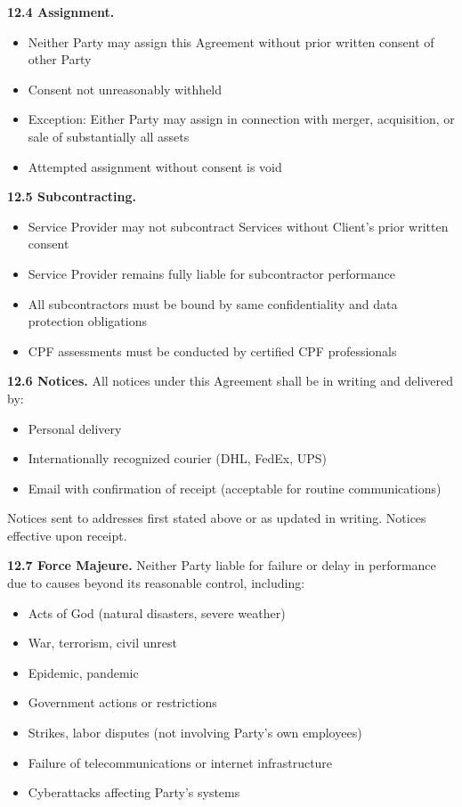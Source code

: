 \documentclass[11pt,a4paper]{article}
\begin{document}
\textbf{12.4 Assignment.}
\begin{itemize}
\item Neither Party may assign this Agreement without prior written consent of other Party
\item Consent not unreasonably withheld
\item Exception: Either Party may assign in connection with merger, acquisition, or sale of substantially all assets
\item Attempted assignment without consent is void
\end{itemize}

\textbf{12.5 Subcontracting.}
\begin{itemize}
\item Service Provider may not subcontract Services without Client's prior written consent
\item Service Provider remains fully liable for subcontractor performance
\item All subcontractors must be bound by same confidentiality and data protection obligations
\item CPF assessments must be conducted by certified CPF professionals
\end{itemize}

\textbf{12.6 Notices.} All notices under this Agreement shall be in writing and delivered by:
\begin{itemize}
\item Personal delivery
\item Internationally recognized courier (DHL, FedEx, UPS)
\item Email with confirmation of receipt (acceptable for routine communications)
\end{itemize}

Notices sent to addresses first stated above or as updated in writing. Notices effective upon receipt.

\textbf{12.7 Force Majeure.} Neither Party liable for failure or delay in performance due to causes beyond its reasonable control, including:
\begin{itemize}
\item Acts of God (natural disasters, severe weather)
\item War, terrorism, civil unrest
\item Epidemic, pandemic
\item Government actions or restrictions
\item Strikes, labor disputes (not involving Party's own employees)
\item Failure of telecommunications or internet infrastructure
\item Cyberattacks affecting Party's systems
\end{itemize}
\end{document}
